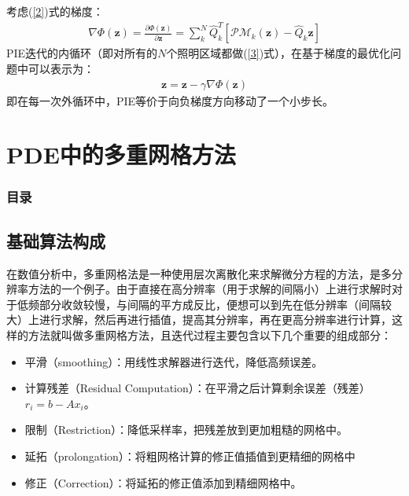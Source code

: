 \documentclass[10pt,aspectratio=169]{beamer} %
\renewcommand{\vec}[1]{\boldsymbol{#1}} %
\begin{document}
\begin{frame}
    考虑(\ref{2})式的梯度：
    \begin{align}
        \nabla  \Phi (\vec{z}) = \frac{\partial \Phi (\vec{z})}{\partial \vec{z}} = \sum_k^N \hat{Q}_k^T [\mathcal{PM}_k(\vec{z})-\hat{Q}_k \vec{z}]
    \end{align}
    PIE迭代的内循环（即对所有的$N$个照明区域都做(\ref{3})式），在基于梯度的最优化问题中可以表示为：
    \begin{align}
        \vec{z}=\vec{z}-\gamma \nabla \Phi (\vec{z})
    \end{align}
    即在每一次外循环中，PIE等价于向负梯度方向移动了一个小步长。
\end{frame}

\section{PDE中的多重网格方法}

\begin{frame}
    \frametitle{目录}
    \tableofcontents[currentsection,subsectionstyle=hide]
\end{frame}

\subsection{基础算法构成}

\begin{frame}
    在数值分析中，多重网格法是一种使用层次离散化来求解微分方程的方法，是多分辨率方法的一个例子。由于直接在高分辨率（用于求解的间隔小）上进行求解时对于低频部分收敛较慢，与间隔的平方成反比，便想可以到先在低分辨率（间隔较大）上进行求解，然后再进行插值，提高其分辨率，再在更高分辨率进行计算，这样的方法就叫做多重网格方法，且迭代过程主要包含以下几个重要的组成部分：
    \begin{itemize}
        \item 平滑（smoothing）：用线性求解器进行迭代，降低高频误差。
        \item 计算残差（Residual Computation）：在平滑之后计算剩余误差（残差）$r_i=b-Ax_i$。
        \item 限制（Restriction）：降低采样率，把残差放到更加粗糙的网格中。
        \item 延拓（prolongation）：将粗网格计算的修正值插值到更精细的网格中
        \item 修正（Correction）：将延拓的修正值添加到精细网格中。
    \end{itemize}
\end{frame}
\end{document}
